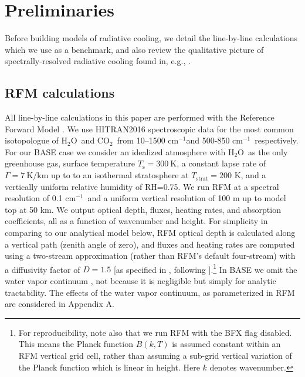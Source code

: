 \documentclass{ametsoc}
\newcommand{\Kelvin}{\ensuremath{\mathrm{K}}}
\newcommand{\km}{\ensuremath{\mathrm{km}}}
\newcommand{\cminverse}{\ensuremath{\mathrm{cm^{-1}}}}
\newcommand{\Ts}{\ensuremath{T_\mathrm{s}}}
\newcommand{\cotwo}{\ensuremath{\mathrm{CO_2}}}
\newcommand{\htwo}{\ensuremath{\mathrm{H_2O}}}
\newcommand{\RH}{\ensuremath{\mathrm{RH}}}
\newcommand{\ch}{\ensuremath{\mathcal{H}}}
\newcommand{\chk}{\ensuremath{\ch_k}}
\newcommand{\Tstrat}{\ensuremath{T_{\mathrm{strat}}}}
\begin{document}
\section{Preliminaries}\label{sec_preliminaries}
Before building models of radiative cooling, we detail the line-by-line calculations which we use as a benchmark, and also review the qualitative picture of spectrally-resolved radiative cooling found in, e.g., \cite{harries2008,clough1992}.

\subsection{RFM calculations} \label{sec_rfm_calcs}
All line-by-line calculations in this paper are performed with the Reference Forward Model \citep[RFM,][]{dudhia2017}. We use HITRAN2016 spectroscopic data for the most common isotopologue of \htwo\ and \cotwo\ from 10--1500 \cminverse and 500-850 \cminverse\ respectively. For our BASE case we consider an idealized atmosphere with \htwo\ as the only greenhouse gas, surface temperature $\Ts=300\ \Kelvin$,  a constant lapse rate of $\Gamma= 7\ \Kelvin/\km$ up to to an isothermal stratosphere at $\Tstrat=200$ K, and a vertically uniform relative humidity of \RH=0.75. We run RFM at a spectral resolution of 0.1 \cminverse\ and a uniform vertical resolution of 100 m up to model top at 50 km. We output optical depth, fluxes, heating rates, and absorption coefficients, all as a function of wavenumber and height. For simplicity in comparing to our analytical model below, RFM optical depth is calculated along a vertical path (zenith angle of zero), and fluxes and heating rates are computed using a two-stream approximation (rather than RFM's default four-stream) with a diffusivity factor of $D=1.5$ [as specified in \cite{dudhia2017}, following \cite{clough1992}].\footnote{For reproducibility, note also that we run RFM with the BFX flag disabled. This means the Planck function $B(k,T)$ is assumed constant within an  RFM vertical grid cell, rather than assuming a sub-grid vertical variation of the Planck function which is linear in height. Here $k$ denotes wavenumber.}  In BASE  we omit the water vapor continuum \citep{shine2012}, not because it is negligible but simply for analytic tractability. The effects of the water vapor continuum, as parameterized in RFM \citep[using the MT\_CKD continuum,][]{mlawer2012} are considered in Appendix A.

\end{document}
